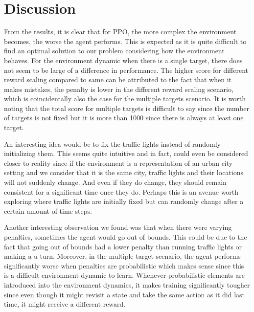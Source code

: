 \documentclass{article}
\begin{document}
\section{Discussion}
From the results, it is clear that for PPO, the more complex the environment becomes, the worse the agent performs. This is expected as it is quite difficult to find an optimal solution to our problem considering how the environment behaves. For the environment dynamic when there is a single target, there does not seem to be large of a difference in performance. The higher score for different reward scaling compared to same can be attributed to the fact that when it makes mistakes, the penalty is lower in the different reward scaling scenario, which is coincidentally also the case for the multiple targets scenario. It is worth noting that the total score for multiple targets is difficult to say since the number of targets is not fixed but it is more than 1000 since there is always at least one target.

An interesting idea would be to fix the traffic lights instead of randomly initializing them. This seems quite intuitive and in fact, could even be considered closer to reality since if the environment is a representation of an urban city setting and we consider that it is the same city, traffic lights and their locations will not suddenly change. And even if they do change, they should remain consistent for a significant time once they do. Perhaps this is an avenue worth exploring where traffic lights are initially fixed but can randomly change after a certain amount of time steps. 

Another interesting observation we found was that when there were varying penalties, sometimes the agent would go out of bounds. This could be due to the fact that going out of bounds had a lower penalty than running traffic lights or making a u-turn. Moreover, in the multiple target scenario, the agent performs significantly worse when penalties are probabilistic which makes sense since this is a difficult environment dynamic to learn. Whenever probabilistic elements are introduced into the environment dynamics, it makes training significantly tougher since even though it might revisit a state and take the same action as it did last time, it might receive a different reward.
\end{document}
